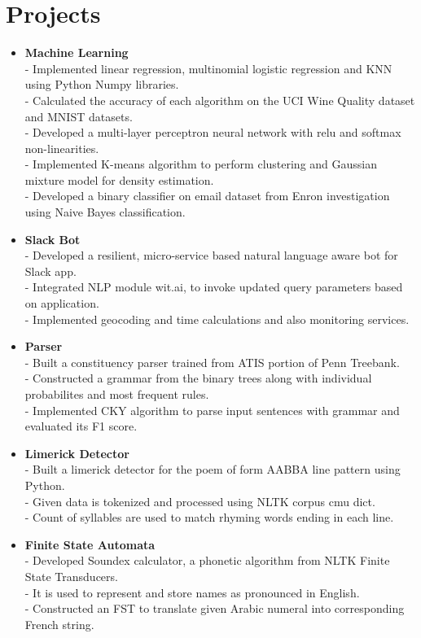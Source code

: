 \section {Projects}
\begin{itemize}


 \item \textbf{Machine Learning} \\
 - Implemented linear regression, multinomial logistic regression and KNN using Python Numpy libraries. \\
 - Calculated the accuracy of each algorithm on the UCI Wine Quality dataset and MNIST datasets.\\
 - Developed a multi-layer perceptron neural network with relu and softmax non-linearities. \\
 - Implemented K-means algorithm to perform clustering and Gaussian mixture model for density estimation.\\
 - Developed a binary classifier on email dataset from Enron investigation using Naive Bayes classification.

 \item \textbf{Slack Bot} \\
 - Developed a resilient, micro-service based natural language aware bot for Slack app.\\
 - Integrated NLP module wit.ai, to invoke updated query parameters based on application.\\
 - Implemented geocoding and time calculations and also monitoring services. 

  \item \textbf{Parser} \\
 - Built a constituency parser trained from ATIS portion of Penn Treebank.\\
 - Constructed a grammar from the binary trees along with individual probabilites and most frequent rules. \\
 - Implemented CKY algorithm to parse input sentences with grammar and evaluated its F1 score.

  \item \textbf{Limerick Detector} \\
 - Built a limerick detector for the poem of form AABBA line pattern using Python.\\
 - Given data is tokenized and processed using NLTK corpus cmu dict.\\
 - Count of syllables are used to match rhyming words ending in each line.

 \item \textbf{Finite State Automata} \\
 - Developed Soundex calculator, a phonetic algorithm  from NLTK Finite State Transducers.\\
 - It is used to represent and store names as pronounced in English.\\
 - Constructed an FST to translate given Arabic numeral into corresponding French string.



\end{itemize}
